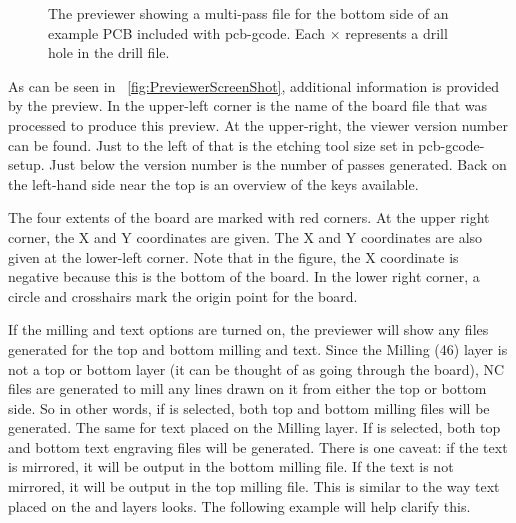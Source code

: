 \documentclass[11pt]{book}
\begin{document}
\begin{figure}
	\caption{The previewer showing a multi-pass file for the bottom side of an example PCB included with pcb-gcode. Each $\times$ represents a drill hole in the drill file.}
	\label{fig:PreviewerScreenShot}
\end{figure}

As can be seen in \figurename~\vref{fig:PreviewerScreenShot}, additional information is provided by the preview. In the upper-left corner is the name of the board file that was processed to produce this preview. At the upper-right, the viewer version number can be found. Just to the left of that is the etching tool size set in pcb-gcode-setup. Just below the version number is the number of passes generated. Back on the left-hand side near the top is an overview of the keys available.

The four extents of the board are marked with red corners. At the upper right corner, the X and Y coordinates are given. The X and Y coordinates are also given at the lower-left corner. Note that in the figure, the X coordinate is negative because this is the bottom of the board. In the lower right corner, a circle and crosshairs mark the origin point for the board.

If the milling and text options are turned on, the previewer will show any files generated for the top and bottom milling and text. Since the Milling (46) layer is not a top or bottom layer (it can be thought of as going through the board), NC files are generated to mill any lines drawn on it from either the top or bottom side. So in other words, if  is selected, both top and bottom milling files will be generated. The same for text placed on the Milling layer. If  is selected, both top and bottom text engraving files will be generated. There is one caveat: if the text is mirrored, it will be output in the bottom milling file. If the text is not mirrored, it will be output in the top milling file. This is similar to the way text placed on the  and  layers looks. The following example will help clarify this.
\end{document}
